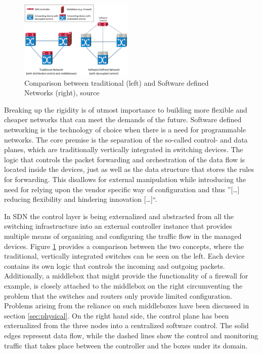 \begin{figure}[h]
	\centering
	\includegraphics[width=0.48\textwidth]{images/sdn.png}
	\caption{Comparison between traditional (left) and Software defined Networks (right), source \cite{li2015software}}
	\label{img:sdn}
\end{figure}

Breaking up the rigidity is of utmost importance to building more flexible and cheaper networks that can  meet the demands of the future. Software defined networking is the technology of choice when there is a need for programmable networks. The core premise is the separation of the so-called control- and data planes, which are traditionally vertically integrated in switching devices. The logic that controls the packet forwarding and orchestration of the data flow is located inside the devices, just as well as the data structure that stores the rules for forwarding. This disallows for external manipulation while introducing the need for relying upon the vendor specific way of configuration and thus ''[\dots]  reducing flexibility and hindering innovation [\dots]``\cite{kreutz2015software}.

In SDN the control layer is being externalized and abstracted from all the switching infrastructure into an external controller instance that provides multiple means of organizing and configuring the traffic flow in the managed devices. Figure \ref{img:sdn} provides a comparison between the two concepts, where the traditional, vertically integrated switches can be seen on the left. Each device contains its own logic that controls the incoming and outgoing packets. Additionally, a middlebox that might provide the functionality of a firewall for example, is closely attached to the middlebox on the right circumventing the problem that the switches and routers only provide limited configuration. Problems arising from the reliance on such middleboxes have been discussed in section \ref{sec:physical}.  On the right hand side, the control plane has been externalized from the three nodes into a centralized software control. The solid edges represent data flow, while the dashed lines show the control and monitoring traffic that takes place between the controller and the boxes under its domain.

